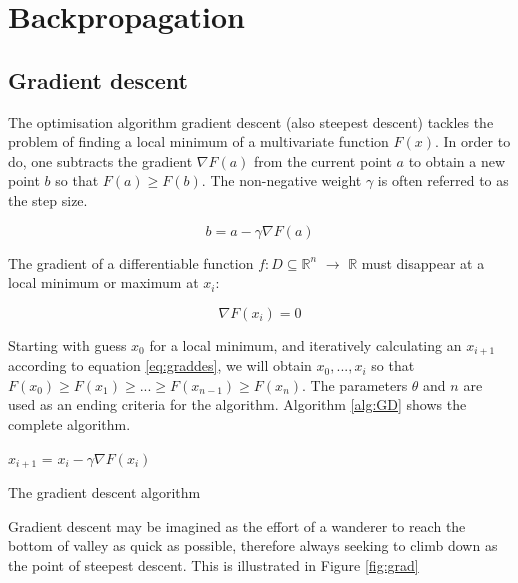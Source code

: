 \documentclass[10pt,a4paper,DIV=11]{scrreprt}
\begin{document}
\section{Backpropagation}

\subsection{Gradient descent}

The optimisation algorithm gradient descent (also steepest descent) tackles the problem of finding a local minimum of a multivariate function $F(x)$. In order to do, one 
subtracts the gradient $\nabla F(a)$ from the current point $a$ to obtain a new point $b$ so that $F(a) \geq F(b)$. The non-negative weight $\gamma$ is often referred to as the 
step size.

\begin{equation}
 b = a - \gamma \nabla F(a)
\label{eq:graddes}
\end{equation} 

The gradient of a differentiable function $f: D \subseteq \mathds{R}^n$ $\rightarrow$ $\mathds{R}$ must disappear at a local minimum or maximum at $x_i$:\cite{MATHINF}

\begin{equation}
\nabla F(x_i) = 0
\end{equation} 

Starting with guess $x_0$ for a local minimum, and iteratively calculating an $x_{i+1}$ according to equation \eqref{eq:graddes}, we will obtain $x_0, ..., x_i$ so that $F(x_0) \geq F(x_1) \geq ... \geq F(x_{n-1}) \geq F(x_n)$. The parameters $\theta$ and $n$ are  used as an ending criteria for the algorithm. Algorithm \ref{alg:GD} shows the complete algorithm.

\begin{algorithm}
\LinesNumbered
\DontPrintSemicolon
\BlankLine
{}
\BlankLine
\Begin
{
    {
        $x_{i+1}$ = $x_i - \gamma \nabla F(x_i)$
    }
}
\caption{The gradient descent algorithm}
\label{alg:GD}
\end{algorithm}

Gradient descent may be imagined as the effort of a wanderer to reach the bottom of valley as quick as possible, therefore always seeking to climb down as the point of steepest 
descent. This is illustrated in Figure \ref{fig:grad}
\end{document}
